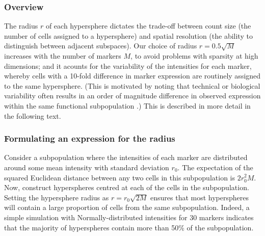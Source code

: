 \documentclass{article}
\begin{document}
\subsubsection{Overview}
The radius $r$ of each hypersphere dictates the trade-off between count size (the number of cells assigned to a hypersphere) and spatial resolution (the ability to distinguish between adjacent subspaces).
Our choice of radius $r=0.5\sqrt{M}$ increases with the number of markers $M$, to avoid problems with sparsity at high dimensions; and it acounts for the variability of the intensities for each marker, whereby cells with a 10-fold difference in marker expression are routinely assigned to the same hypersphere.
(This is motivated by noting that technical or biological variability often results in an order of magnitude difference in observed expression within the same functional subpopulation \cite{zunder2015palladium, ornatsky2008study,zunder2015continuous}.)
This is described in more detail in the following text.

\subsubsection{Formulating an expression for the radius}
Consider a subpopulation where the intensities of each marker are distributed around some mean intensity with standard deviation $r_0$.
The expectation of the squared Euclidean distance between any two cells in this subpopulation is $2r_0^2M$.
Now, construct hyperspheres centred at each of the cells in the subpopulation.
Setting the hypersphere radius as $r=r_0\sqrt{2M}$ ensures that most hyperspheres will contain a large proportion of cells from the same subpopulation.
Indeed, a simple simulation with Normally-distributed intensities for 30 markers indicates that the majority of hyperspheres contain more than 50\% of the subpopulation.

\end{document}
